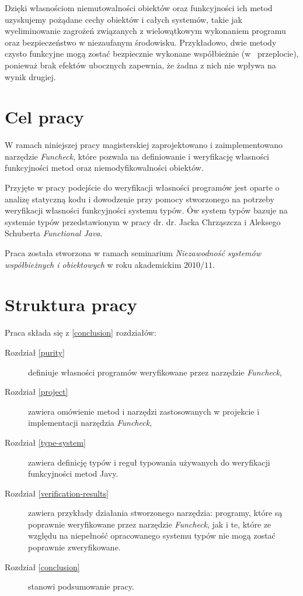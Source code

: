 \documentclass{pracamgr}
\begin{document}
Dzięki własnościom niemutowalności obiektów oraz funkcyjności ich
metod uzyskujemy pożądane cechy obiektów i całych systemów, takie jak
wyeliminowanie zagrożeń związanych z wielowątkowym wykonaniem programu
oraz bezpieczeństwo w niezaufanym środowisku. Przykładowo, dwie metody
czysto funkcyjne mogą zostać bezpiecznie wykonane współbieżnie (w~
przeplocie), ponieważ brak efektów ubocznych zapewnia, że żadna z nich
nie wpływa na wynik drugiej.

\section*{Cel pracy}

W ramach niniejszej pracy magisterskiej zaprojektowano i
zaimplementowano narzędzie \emph{Funcheck}, które pozwala na
definiowanie i weryfikację własności funkcyjności metod oraz
niemodyfikowalności obiektów. 

Przyjęte w pracy podejście do weryfikacji własności programów jest
oparte o analizę statyczną kodu i dowodzenie przy pomocy stworzonego
na potrzeby weryfikacji własności funkcyjności systemu typów. Ów
system typów bazuje na systemie typów przedstawionym w pracy
dr. dr. Jacka Chrząszcza i Aleksego Schuberta \emph{Functional
  Java}. %

Praca została stworzona w ramach seminarium \emph{Niezawodność systemów 
współbieżnych i obiektowych} w roku akademickim $2010/11$.


\section*{Struktura pracy}

Praca składa się z \ref{conclusion} rozdziałów:
\begin{description}
\item[Rozdział \ref{purity}] definiuje własności programów
  weryfikowane przez narzędzie \emph{Funcheck},
\item[Rozdział \ref{project}] zawiera omówienie metod i narzędzi
  zastosowanych w projekcie i implementacji narzędzia \emph{Funcheck}, 
\item[Rozdział \ref{type-system}] zawiera definicję typów i reguł
  typowania używanych do weryfikacji funkcyjności metod Javy.
\item[Rozdział \ref{verification-results}] zawiera przykłady działania
  stworzonego narzędzia: programy, które są poprawnie weryfikowane
  przez narzędzie \emph{Funcheck}, jak i te, które ze względu na
  niepełność opracowanego systemu typów nie mogą zostać poprawnie
  zweryfikowane.
\item[Rozdział \ref{conclusion}] stanowi podsumowanie pracy. 
\end{description}
\end{document}
